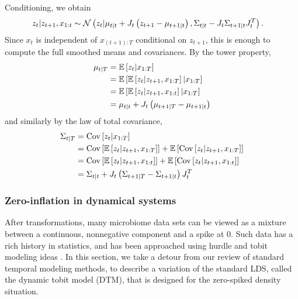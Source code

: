 Conditioning, we obtain
\begin{align*}
  z_{t} \vert z_{t + 1}, x_{1:t} &\sim \mathcal{N}\left(
  z_{t} \vert \mu_{t \vert t} + J_{t}\left(z_{t + 1} - \mu_{t + 1 \vert t}\right),
  \Sigma_{t \vert t} - J_{t} \Sigma_{t + 1 \vert t} J_{t}^{T}
  \right).
\end{align*}
Since $x_{t}$ is independent of $x_{(t + 1): T}$ conditional on $z_{t + 1}$,
this is enough to compute the full smoothed means and covariances. By the tower
property,
\begin{align*}
  \mu_{t \vert T} &= \mathbb{E}\left[{z_{t} \vert x_{1:T}}\right] \\
  &= \mathbb{E}\left[{\mathbb{E}\left[{z_{t} \vert z_{t + 1}, x_{1 : T}}\right] \vert x_{1:T}}\right] \\
  &= \mathbb{E}\left[{\mathbb{E}\left[{z_{t} \vert z_{t + 1}, x_{1:t}}\right] \vert x_{1:T}}\right] \\
  &= \mu_{t \vert t} + J_{t}\left(\mu_{t + 1 \vert T} - \mu_{t + 1 \vert t}\right)
\end{align*}
and similarly by the law of total covariance,
\begin{align*}
  \Sigma_{t\vert T} &= \mathrm{Cov}\left[{z_{t} \vert x_{1:T}}\right] \\
  &= \mathrm{Cov}\left[{\mathbb{E}\left[{z_{t} \vert z_{t + 1}, x_{1:T}}\right]}\right] + \mathbb{E}\left[{\mathrm{Cov}\left[{z_{t} \vert z_{t + 1}, x_{1:T}}\right]}\right] \\
  &= \mathrm{Cov}\left[{\mathbb{E}\left[{z_{t} \vert z_{t + 1}, x_{1:t}}\right]}\right] + \mathbb{E}\left[{\mathrm{Cov}\left[{z_{t} \vert z_{t + 1}, x_{1:t}}\right]}\right] \\
  &= \Sigma_{t \vert t} + J_{t}\left(\Sigma_{t + 1 \vert T} - \Sigma_{t + 1 \vert t}\right) J_{t}^{T}
\end{align*}

\subsubsection{Zero-inflation in dynamical systems}
\label{subsubsec:zero_inflation_dynamical}

After transformations, many microbiome data sets can be viewed as a mixture
between a continuous, nonnegative component and a spike at 0. Such data has a
rich history in statistics, and has been approached using hurdle and tobit
modeling ideas \citep{min2002modeling}. In this section, we take a detour from
our review of standard temporal modeling methods, to describe a variation of the
standard LDS, called the dynamic tobit model (DTM), that is designed for the
zero-spiked density situation.

